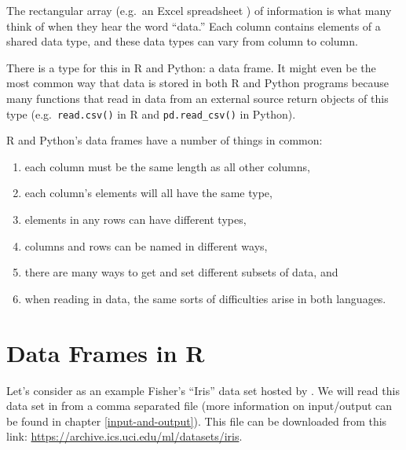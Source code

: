 \documentclass[
  12pt,
  krantz2]{krantz}
\providecommand{\tightlist}{%
  \setlength{\itemsep}{0pt}\setlength{\parskip}{0pt}}
\begin{document}
The rectangular array (e.g.~an Excel spreadsheet ) of information is what many think of when they hear the word ``data.'' Each column contains elements of a shared data type, and these data types can vary from column to column.

There is a type for this in R and Python: a data frame. It might even be the most common way that data is stored in both R and Python programs because many functions that read in data from an external source return objects of this type (e.g.~\texttt{read.csv()} in R and \texttt{pd.read\_csv()} in Python).

R and Python's data frames have a number of things in common:

\begin{enumerate}
\def\labelenumi{\arabic{enumi}.}
\tightlist
\item
  each column must be the same length as all other columns,
\item
  each column's elements will all have the same type,
\item
  elements in any rows can have different types,
\item
  columns and rows can be named in different ways,
\item
  there are many ways to get and set different subsets of data, and
\item
  when reading in data, the same sorts of difficulties arise in both languages.
\end{enumerate}

\hypertarget{data-frames-in-r}{%
\section{Data Frames in R}\label{data-frames-in-r}}

Let's consider as an example Fisher's ``Iris'' data set \citep{misc_iris_53} hosted by \citep{uci_data}. We will read this data set in from a comma separated file (more information on input/output can be found in chapter \ref{input-and-output}). This file can be downloaded from this link: \url{https://archive.ics.uci.edu/ml/datasets/iris}.
\end{document}
